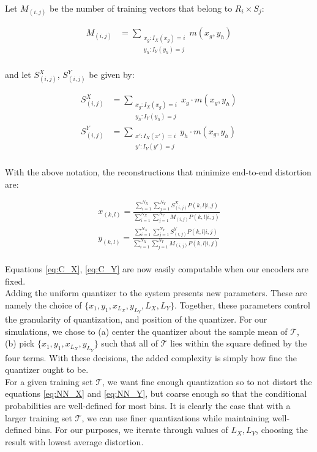 \documentclass[10pt]{article}
\begin{document}
Let $M_{(i,j)}$ be the number of training vectors that belong to $R_i\times S_j$:

\begin{align}
    M_{(i,j)} &=
    \sum_{\substack{x_g:I_X(x_g)=i\\y_h:I_Y(y_h)=j}}m(x_g,y_h)
\end{align}
\\
and let $S_{(i,j)}^X$, $S_{(i,j)}^Y$ be given by:

\begin{align}
    S^X_{(i,j)} &=
    \sum_{\substack{x_g:I_X(x_g)=i\\y_h:I_Y(y_h)=j}}x_g\cdot m(x_g,y_h)\\
    S^Y_{(i,j)} &=
    \sum_{\substack{x':I_X(x')=i\\y':I_Y(y')=j}}y_h\cdot m(x_g,y_h)
\end{align}
\\
With the above notation, the reconstructions that minimize end-to-end distortion are:

\begin{align}
    \label{eq:C_X}
    x_{(k,l)} = 
        \frac{\sum_{i=1}^{N_X} \sum_{j=1}^{N_Y}
        S_{(i,j)}^X P(k,l|i,j)}
        {\sum_{i=1}^{N_X} \sum_{j=1}^{N_Y}
        M_{(i,j)} P(k,l|i,j)}\\
    \label{eq:C_Y}
    y_{(k,l)} = 
        \frac{\sum_{i=1}^{N_X} \sum_{j=1}^{N_Y}
        S_{(i,j)}^Y P(k,l|i,j)}
        {\sum_{i=1}^{N_X} \sum_{j=1}^{N_Y}
        M_{(i,j)} P(k,l|i,j)}
\end{align}
\\
Equations \eqref{eq:C_X}, \eqref{eq:C_Y} are now easily computable when our encoders are fixed.\\

Adding the uniform quantizer to the system presents new parameters. These are namely the choice of $\{x_1, y_1, x_{L_X}, y_{L_Y}, L_X, L_Y\}$. Together, these parameters control the granularity of quantization, and position of the quantizer. For our simulations, we chose to (a) center the quantizer about the sample mean of $\mathcal T$, (b) pick $\{x_1, y_1, x_{L_X}, y_{L_Y}\}$ such that all of $\mathcal T$ lies within the square defined by the four terms. With these decisions, the added complexity is simply how fine the quantizer ought to be.\\

For a given training set $\mathcal T$, we want fine enough quantization so to not distort the equations \eqref{eq:NN_X} and \eqref{eq:NN_Y}, but coarse enough so that the conditional probabilities are well-defined for most bins. It is clearly the case that with a larger training set $\mathcal T$, we can use finer quantizations while maintaining well-defined bins. For our purposes, we iterate through values of $L_X, L_Y$, choosing the result with lowest average distortion.\\
\end{document}
